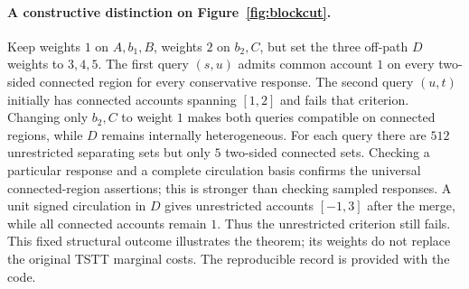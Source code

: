 \paragraph{A constructive distinction on Figure~\ref{fig:blockcut}.}
Keep weights $1$ on $A,b_1,B$, weights $2$ on $b_2,C$, but set the three
off-path $D$ weights to $3,4,5$. The first query $(s,u)$ admits common
account $1$ on every two-sided connected region for every conservative
response. The second query $(u,t)$ initially has connected accounts
spanning $[1,2]$ and fails that criterion. Changing only $b_2,C$ to
weight $1$ makes both queries compatible on connected regions, while
$D$ remains internally heterogeneous. For each query there are $512$
unrestricted separating sets but only $5$ two-sided connected sets.
Checking a particular response and a complete circulation basis confirms
the universal connected-region assertions; this is stronger than checking
sampled responses. A unit signed circulation in $D$ gives unrestricted
accounts $[-1,3]$ after the merge, while all connected accounts remain
$1$. Thus the unrestricted criterion still fails. This fixed structural
outcome illustrates the theorem; its weights do not replace the original
TSTT marginal costs. The reproducible record is provided with the code.
